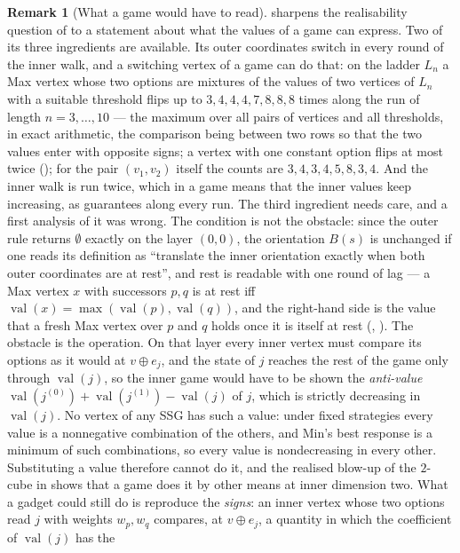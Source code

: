 \documentclass[11pt]{article}
\theoremstyle{plain}
\theoremstyle{definition}
\newtheorem{remark}[theorem]{Remark}
\DeclareMathOperator{\val}{val}
\begin{document}
\begin{remark}[What a game would have to read]\label{rem:blowup-realise}
 sharpens the realisability question of
 to a statement about what the values of a game can
express. Two of its three ingredients are available. Its outer
coordinates switch in every round of the inner walk, and a switching
vertex of a game can do that: on the ladder $L_n$ a Max vertex whose two
options are mixtures of the values of two vertices of $L_n$ with a suitable
threshold flips up to $3,4,4,4,7,8,8,8$ times along the run of length
$n=3,\dots,10$ --- the maximum over all pairs of vertices and all
thresholds, in exact arithmetic, the comparison being between two rows so
that the two values enter with opposite signs; a vertex with one constant
option flips at most twice (); for the pair $(v_1,v_2)$
itself the counts are $3,4,3,4,5,8,3,4$. And the inner walk is run twice, which
in a game means that the inner values keep increasing, as 
guarantees along every run. The third ingredient needs care, and a first analysis of it was wrong.
The condition is not the obstacle: since the outer rule returns
$\emptyset$ exactly on the layer $(0,0)$, the orientation $B(s)$ is
unchanged if one reads its definition as ``translate the inner orientation
exactly when both outer coordinates are at rest'', and rest is readable
with one round of lag --- a Max vertex $x$ with successors $p,q$ is at rest
iff $\val(x)=\max(\val(p),\val(q))$, and the right-hand side is the value
that a fresh Max vertex over $p$ and $q$ holds once it is itself at rest
(, ). The obstacle is the operation. On that layer
every inner vertex must compare its options as it would at $v\oplus e_j$,
and the state of $j$ reaches the rest of the game only through
$\val(j)$, so the inner game would have to be shown the \emph{anti-value}
$\val(j^{(0)})+\val(j^{(1)})-\val(j)$ of $j$, which is strictly decreasing
in $\val(j)$. No vertex of any SSG has such a value: under fixed
strategies every value is a nonnegative combination of the others, and
Min's best response is a minimum of such combinations, so every value is nondecreasing in every other. Substituting a value therefore
cannot do it, and the realised blow-up of the $2$-cube in
 shows that a game does it by other means at
inner dimension two. What a gadget could still do is reproduce the \emph{signs}: an inner
vertex whose two options read $j$ with weights $w_p,w_q$ compares, at
$v\oplus e_j$, a quantity in which the coefficient of $\val(j)$ has the

\end{remark}
\end{document}
